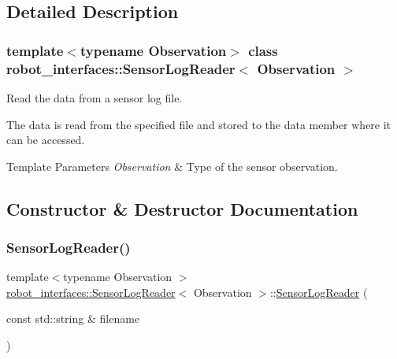 \subsection{Detailed Description}
\subsubsection*{template$<$typename Observation$>$\newline
class robot\+\_\+interfaces\+::\+Sensor\+Log\+Reader$<$ Observation $>$}

Read the data from a sensor log file. 

The data is read from the specified file and stored to the {\ttfamily data} member where it can be accessed.


\begin{DoxyTemplParams}{Template Parameters}
{\em Observation} & Type of the sensor observation. \\
\hline
\end{DoxyTemplParams}


\subsection{Constructor \& Destructor Documentation}
\mbox{\label{classrobot__interfaces_1_1SensorLogReader_af98cfbebee2e96b24dcba44dff27b783}} 
\subsubsection{\texorpdfstring{Sensor\+Log\+Reader()}{SensorLogReader()}}
{\footnotesize\ttfamily template$<$typename Observation $>$ \\
\hyperlink{classrobot__interfaces_1_1SensorLogReader}{robot\+\_\+interfaces\+::\+Sensor\+Log\+Reader}$<$ Observation $>$\+::\hyperlink{classrobot__interfaces_1_1SensorLogReader}{Sensor\+Log\+Reader} (\begin{DoxyParamCaption}\item[{const std\+::string \&}]{filename }\end{DoxyParamCaption})\hspace{0.3cm}{\ttfamily [inline]}}



